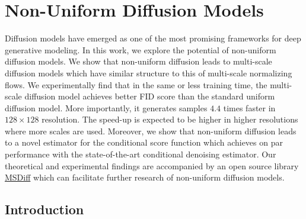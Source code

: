
\chapter{Non-Uniform Diffusion Models}\label{Chapter:non-uniform-diffusion-models}

\ifpdf
    \graphicspath{{Chapter2/Figs/Raster/}{Chapter2/Figs/PDF/}{Chapter2/Figs/}}
\else
    \graphicspath{{Chapter2/Figs/Vector/}{Chapter2/Figs/}}
\fi


Diffusion models have emerged as one of the most promising frameworks for deep generative modeling. In this work, we explore the potential of non-uniform diffusion models. We show that non-uniform diffusion leads to multi-scale diffusion models which have similar structure to this of multi-scale normalizing flows. We experimentally find that in the same or less training time, the multi-scale diffusion model achieves better FID score than the standard uniform diffusion model. More importantly, it generates samples $4.4$ times faster in $128\times 128$ resolution. The speed-up is expected to be higher in higher resolutions where more scales are used. Moreover, we show that non-uniform diffusion leads to a novel estimator for the conditional score function which achieves on par performance with the state-of-the-art conditional denoising estimator. Our theoretical and experimental findings are accompanied by an open source library \href{https://github.com/GBATZOLIS/MSDiff}{MSDiff}
which can facilitate further research of non-uniform diffusion models.

\section{Introduction}

